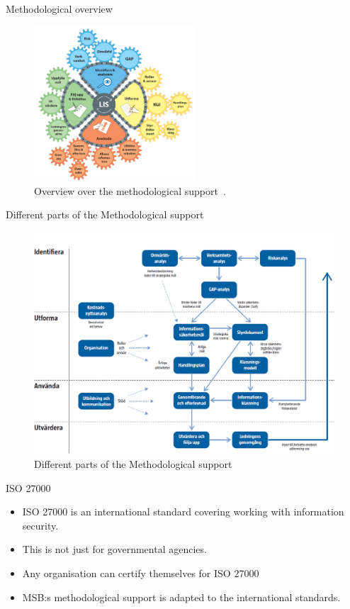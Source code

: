 \documentclass{beamer}
\begin{document}
\begin{frame}{Methodological overview}
  \begin{figure}
    \includegraphics[width=6cm]{Figures/kugghjulet_lis.png}
    \caption{Overview over the methodological support~\cite{msb_metodstod}.}
  \end{figure}
\end{frame}

\begin{frame}{Different parts of the Methodological support}
  \begin{figure}
    \includegraphics[width=\textwidth]{Figures/oversiktsbild-over-metodstegens-olika-delar-och-hur-de-relaterar-till-varandra.png}
    \caption{Different parts of the Methodological support~\cite{msb_metodstod}}
  \end{figure}
\end{frame}

\begin{frame}{ISO 27000}
  \begin{itemize}
    \item ISO 27000 is an international standard covering working with
      information security.
    \item This is not just for governmental agencies.
    \item Any organisation can certify themselves for ISO 27000
    \item MSB:s methodological support is adapted to the international
      standards.
  \end{itemize}
\end{frame}
\end{document}
